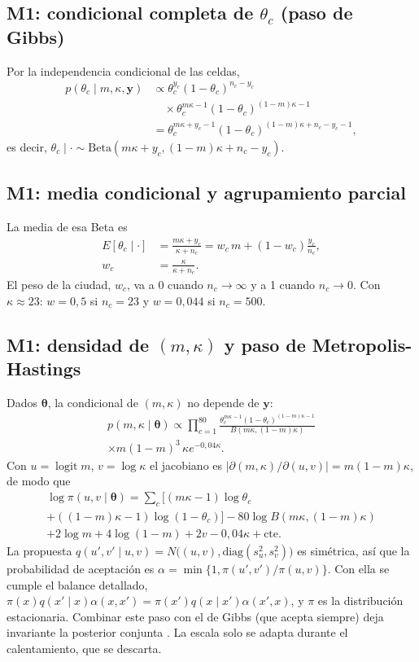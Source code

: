 \documentclass[10pt,twocolumn]{article}
\newcommand{\logit}{\operatorname{logit}}
\begin{document}
\subsection{M1: condicional completa de $\theta_c$ (paso de Gibbs)}
Por la independencia condicional de las celdas,
\begin{align*}
p(\theta_c\mid m,\kappa,\bm y)&\propto \theta_c^{y_c}(1-\theta_c)^{n_c-y_c}\\
&\quad\times\theta_c^{m\kappa-1}(1-\theta_c)^{(1-m)\kappa-1}\\
&=\theta_c^{m\kappa+y_c-1}(1-\theta_c)^{(1-m)\kappa+n_c-y_c-1},
\end{align*}
es decir, $\theta_c\mid\cdot\sim\mathrm{Beta}(m\kappa+y_c,(1-m)\kappa+n_c-y_c)$.

\subsection{M1: media condicional y agrupamiento parcial}\label{apx:enc}
La media de esa Beta es
\begin{align*}
E[\theta_c\mid\cdot]&=\frac{m\kappa+y_c}{\kappa+n_c}=w_c\,m+(1-w_c)\frac{y_c}{n_c},\\
w_c&=\frac{\kappa}{\kappa+n_c}.
\end{align*}
El peso de la ciudad, $w_c$, va a 0 cuando $n_c\to\infty$ y a 1 cuando $n_c\to0$. Con $\kappa\approx23$: $w=0{,}5$ si $n_c=23$ y $w=0{,}044$ si $n_c=500$.

\subsection{M1: densidad de $(m,\kappa)$ y paso de Metropolis-Hastings}\label{apx:m1}
Dados $\bm\theta$, la condicional de $(m,\kappa)$ no depende de $\bm y$:
\begin{multline*}
p(m,\kappa\mid\bm\theta)\propto\prod_{c=1}^{80}\frac{\theta_c^{m\kappa-1}(1-\theta_c)^{(1-m)\kappa-1}}{B(m\kappa,(1-m)\kappa)}\\
\times m(1-m)^{3}\,\kappa e^{-0{,}04\kappa}.
\end{multline*}
Con $u=\logit m$, $v=\log\kappa$ el jacobiano es $|\partial(m,\kappa)/\partial(u,v)|=m(1-m)\kappa$, de modo que
\begin{multline}
\log\pi(u,v\mid\bm\theta)=\sum_c\big[(m\kappa-1)\log\theta_c\\
+((1-m)\kappa-1)\log(1-\theta_c)\big]-80\log B(m\kappa,(1-m)\kappa)\\
+2\log m+4\log(1-m)+2v-0{,}04\kappa+\text{cte.}\label{eq:apx_m1}
\end{multline}
La propuesta $q(u',v'\mid u,v)=N\big((u,v),\mathrm{diag}(s_u^2,s_v^2)\big)$ es simétrica, así que la probabilidad de aceptación es $\alpha=\min\{1,\pi(u',v')/\pi(u,v)\}$. Con ella se cumple el balance detallado, $\pi(x)q(x'\mid x)\alpha(x,x')=\pi(x')q(x\mid x')\alpha(x',x)$, y $\pi$ es la distribución estacionaria. Combinar este paso con el de Gibbs (que acepta siempre) deja invariante la posterior conjunta \citep[cap.~11]{gelman2013bda}. La escala solo se adapta durante el calentamiento, que se descarta.
\end{document}
